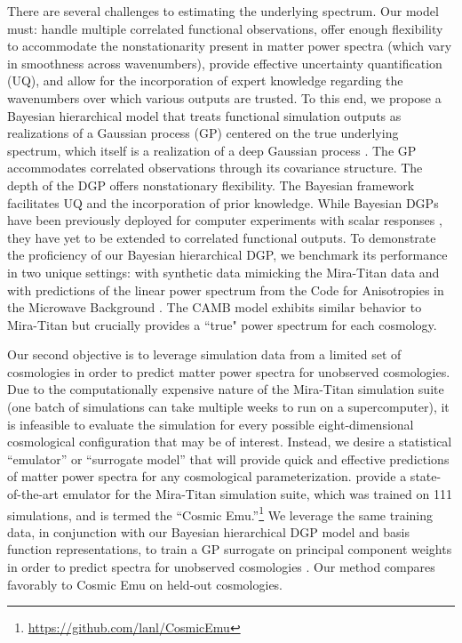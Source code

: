 \documentclass[11pt]{article}
\begin{document}
There are several challenges to estimating the underlying spectrum.  Our model
must: handle multiple correlated functional observations, offer enough 
flexibility to accommodate the nonstationarity present in matter power spectra 
(which vary in smoothness across wavenumbers), provide effective uncertainty
quantification (UQ), and allow for the incorporation of expert knowledge 
regarding the wavenumbers over which various outputs are trusted.  To this end, 
we propose a Bayesian hierarchical model that treats functional simulation 
outputs as realizations of a Gaussian process (GP) 
centered on the true underlying spectrum, which itself is a realization of a deep Gaussian process 
\citep[DGP;][]{damianou2013deep}.  The GP accommodates correlated observations
through its covariance structure.  The depth of the DGP offers nonstationary
flexibility.  The Bayesian framework facilitates UQ and the incorporation of prior
knowledge.  While Bayesian DGPs have been previously deployed for computer experiments 
with scalar responses \citep[e.g.,][]{sauer2023active,sauer2023vecchia,ming2023deep}, 
they have yet to be extended to correlated functional outputs. 
To demonstrate the proficiency of our Bayesian hierarchical DGP, 
we benchmark its performance in two unique settings: with synthetic data 
mimicking the Mira-Titan data and with predictions of the linear power spectrum from 
the Code for Anisotropies in the Microwave Background \citep[CAMB;][]{lewis2011CAMB}.
The CAMB model exhibits similar behavior to Mira-Titan but crucially
provides a ``true" power spectrum for each cosmology.

Our second objective is to leverage simulation data from a limited set of
cosmologies in order to predict matter power spectra for unobserved cosmologies.
Due to the computationally expensive nature of the Mira-Titan simulation suite
(one batch of simulations can take multiple weeks to run on a supercomputer),
it is infeasible to evaluate the simulation for every possible eight-dimensional
cosmological configuration that may be of interest.  Instead, we desire
a statistical ``emulator'' or ``surrogate model'' 
\citep{santner2003design,gramacy2020surrogates} that will provide quick and effective
predictions of matter power spectra for any cosmological parameterization.
\citet{moran2023mira} provide a state-of-the-art emulator for the Mira-Titan
simulation suite, which was trained on 111 simulations, and is termed 
the ``Cosmic Emu.''\footnote{\url{https://github.com/lanl/CosmicEmu}}
We leverage the same training data, in conjunction with our Bayesian hierarchical
DGP model and basis function representations, to train a GP surrogate 
on principal component weights in order to predict spectra for unobserved
cosmologies \citep{higdon2008computer, higdon2010estcosmo}. 
Our method compares favorably to Cosmic Emu on held-out cosmologies.
\end{document}
